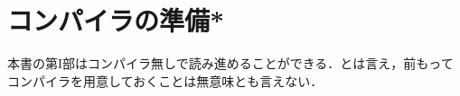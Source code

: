 \documentclass[a5paper,twoside,fleqn,draft]{jsbook}
\begin{document}






\section{\haskell コンパイラの準備*}

本書の第I部は\haskell コンパイラ無しで読み進めることができる．とは言え，前もって\haskell コンパイラを用意しておくことは無意味とも言えない．


\end{document}
